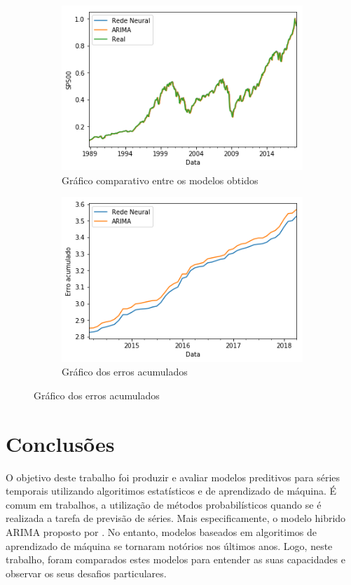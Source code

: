 \documentclass[
    12pt,
    oneside,
    a4paper,
    english,
    brazil
]{abntex2}
\begin{document}
\begin{figure}[ht]
    \caption{Comparativos dos resultados}
    \begin{subfigure}{.5\textwidth}
        \caption{Gráfico comparativo entre os modelos obtidos}\label{fig:comparesp500}
        \includegraphics[width=.8\linewidth]{images/sp500_prediction_compare.png}
    \end{subfigure}
    \begin{subfigure}{.5\textwidth}
        \caption{Gráfico dos erros acumulados}\label{fig:comparesp500}
        \includegraphics[width=.8\linewidth]{images/sp500_cumsum.png}
    \end{subfigure}
\end{figure}

\chapter{Conclusões}\label{chap:concl}

O objetivo deste trabalho foi produzir e avaliar modelos preditivos para séries
temporais utilizando  algoritimos estatísticos e  de aprendizado de  máquina. É
comum  em  trabalhos, a  utilização  de  métodos  probabilísticos quando  se  é
realizada  a tarefa  de  previsão  de séries.  Mais  especificamente, o  modelo
hibrido ARIMA  proposto por .  No entanto, modelos  baseados em
algoritimos de  aprendizado de máquina  se tornaram notórios nos  últimos anos.
Logo,  neste trabalho,  foram comparados  estes modelos  para entender  as suas
capacidades e observar os seus desafios particulares.
\end{document}
